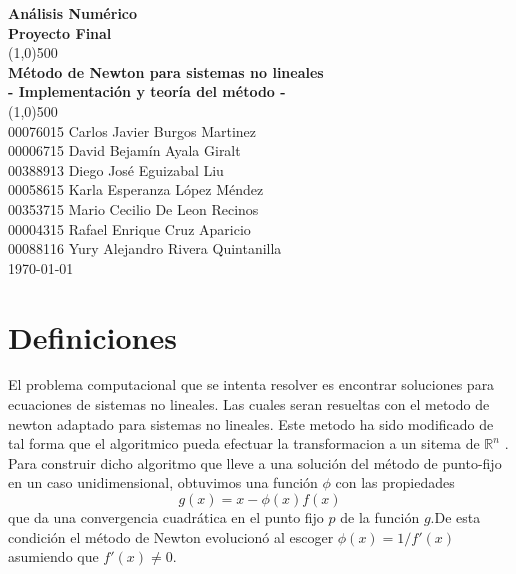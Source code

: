 ﻿\documentclass[11pt]{article}
\begin{document}
\begin{titlepage}

\begin{center}
\Large{\textbf{Análisis Numérico}}\\
\Large{\textbf{Proyecto Final}}\\
\vfill
\line(1,0){500}\\[1mm]

\huge{\textbf{Método de Newton para sistemas no lineales}}\\[3mm]
\Large{\textbf{- Implementación y teoría del método -}}\\[1mm]

\line(1,0){500}\\
\vfill
00076015 Carlos Javier Burgos Martinez\\
00006715 David Bejamín Ayala Giralt\\
00388913 Diego José Eguizabal Liu\\
00058615 Karla Esperanza López Méndez\\
00353715 Mario Cecilio De Leon Recinos\\
00004315 Rafael Enrique Cruz Aparicio \\
00088116 Yury Alejandro Rivera Quintanilla\\
\vfill
\today\\

\end{center}

\end{titlepage}

\tableofcontents
\thispagestyle{empty}
\clearpage

\setcounter{page}{1}

\section{Definiciones}

El problema computacional que se intenta resolver es encontrar soluciones para ecuaciones de sistemas no lineales. Las cuales seran resueltas con el metodo de newton adaptado para sistemas no lineales. Este metodo ha sido modificado de tal forma que el algoritmico
pueda efectuar la transformacion a un sitema de $\mathbb{R}^{n}$ .\\

Para construir dicho algoritmo que lleve a una solución del método de punto-fijo en un caso unidimensional, obtuvimos una función $\phi$ con las propiedades $$g(x)=x-\phi(x)f(x)$$ que da una convergencia cuadrática en el punto fijo $p$ de la función $g$.De esta condición el método de Newton evolucionó al escoger $\phi(x)=1/f'(x)$ asumiendo que $f'(x)\neq0$.\\
\end{document}
